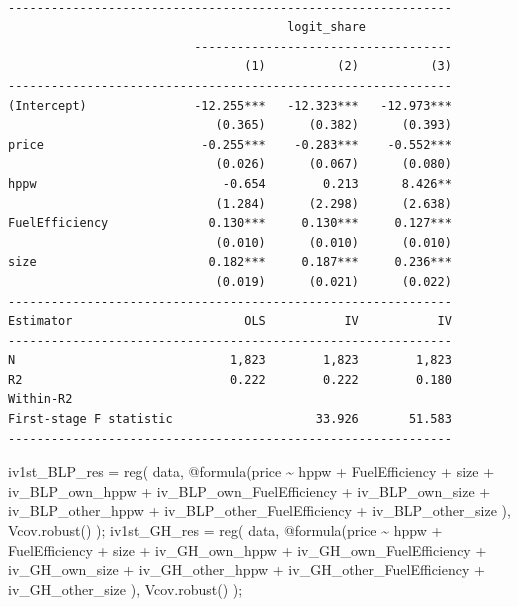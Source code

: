 \documentclass[
  letterpaper,
  DIV=11,
  numbers=noendperiod]{scrreprt}
\newenvironment{Shaded}{\begin{snugshade}}{\end{snugshade}}
\newcommand{\FunctionTok}[1]{\textcolor[rgb]{0.28,0.35,0.67}{#1}}
\newcommand{\NormalTok}[1]{\textcolor[rgb]{0.00,0.23,0.31}{#1}}
\newcommand{\OperatorTok}[1]{\textcolor[rgb]{0.37,0.37,0.37}{#1}}
\newcommand{\PreprocessorTok}[1]{\textcolor[rgb]{0.68,0.00,0.00}{#1}}
\begin{document}
\begin{verbatim}

--------------------------------------------------------------
                                       logit_share            
                          ------------------------------------
                                 (1)          (2)          (3)
--------------------------------------------------------------
(Intercept)               -12.255***   -12.323***   -12.973***
                             (0.365)      (0.382)      (0.393)
price                      -0.255***    -0.283***    -0.552***
                             (0.026)      (0.067)      (0.080)
hppw                          -0.654        0.213      8.426**
                             (1.284)      (2.298)      (2.638)
FuelEfficiency              0.130***     0.130***     0.127***
                             (0.010)      (0.010)      (0.010)
size                        0.182***     0.187***     0.236***
                             (0.019)      (0.021)      (0.022)
--------------------------------------------------------------
Estimator                        OLS           IV           IV
--------------------------------------------------------------
N                              1,823        1,823        1,823
R2                             0.222        0.222        0.180
Within-R2                                                     
First-stage F statistic                    33.926       51.583
--------------------------------------------------------------
\end{verbatim}

\begin{Shaded}
\begin{Highlighting}[]
\NormalTok{iv1st\_BLP\_res }\OperatorTok{=} \FunctionTok{reg}\NormalTok{(}
\NormalTok{    data, }
    \PreprocessorTok{@formula}\NormalTok{(price }\OperatorTok{\textasciitilde{}}\NormalTok{ hppw }\OperatorTok{+}\NormalTok{ FuelEfficiency }\OperatorTok{+}\NormalTok{ size }\OperatorTok{+}
\NormalTok{            iv\_BLP\_own\_hppw }\OperatorTok{+}\NormalTok{ iv\_BLP\_own\_FuelEfficiency }\OperatorTok{+}\NormalTok{ iv\_BLP\_own\_size }\OperatorTok{+} 
\NormalTok{            iv\_BLP\_other\_hppw }\OperatorTok{+}\NormalTok{ iv\_BLP\_other\_FuelEfficiency }\OperatorTok{+}\NormalTok{ iv\_BLP\_other\_size}
\NormalTok{        ),}
\NormalTok{    Vcov.}\FunctionTok{robust}\NormalTok{()}
\NormalTok{);}
\NormalTok{iv1st\_GH\_res }\OperatorTok{=} \FunctionTok{reg}\NormalTok{(}
\NormalTok{    data, }
    \PreprocessorTok{@formula}\NormalTok{(price }\OperatorTok{\textasciitilde{}}\NormalTok{ hppw }\OperatorTok{+}\NormalTok{ FuelEfficiency }\OperatorTok{+}\NormalTok{ size }\OperatorTok{+}
\NormalTok{            iv\_GH\_own\_hppw }\OperatorTok{+}\NormalTok{ iv\_GH\_own\_FuelEfficiency }\OperatorTok{+}\NormalTok{ iv\_GH\_own\_size }\OperatorTok{+} 
\NormalTok{            iv\_GH\_other\_hppw }\OperatorTok{+}\NormalTok{ iv\_GH\_other\_FuelEfficiency }\OperatorTok{+}\NormalTok{ iv\_GH\_other\_size}
\NormalTok{        ),}
\NormalTok{    Vcov.}\FunctionTok{robust}\NormalTok{()}
\NormalTok{);}
\end{Highlighting}
\end{Shaded}
\end{document}
